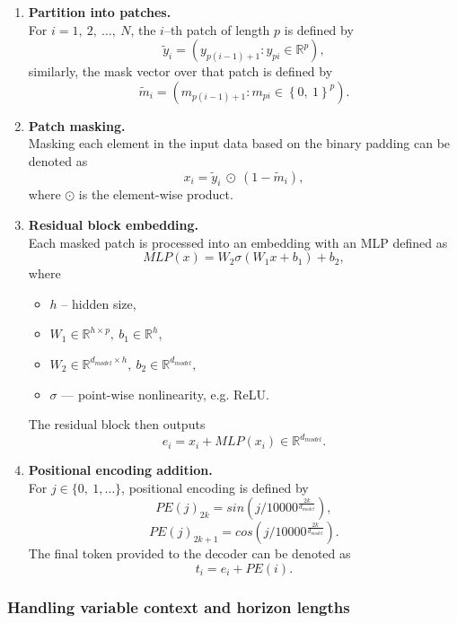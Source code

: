 \begin{enumerate}
    \item \textbf{Partition into patches.}\\
        For $ i = 1,\ 2,\ \ldots, \ N $, the $ i $--th patch of length $ p $ is defined by
        \[ \tilde{y}_i = \left( y_{p(i-1)+1}:y_{pi} \in \mathbb{R}^p \right),\]
        similarly, the mask vector over that patch is defined by
        \[ \tilde{m}_i=\left( m_{p(i-1)+1}:m_{pi} \in \left\{ 0,\ 1 \right\}^p \right).\]
    \item \textbf{Patch masking.}\\
        Masking each element in the input data based on the binary padding can be denoted as
        \[ x_i = \tilde{y}_i\ \odot\ (1-\tilde{m}_i),\]
        where $\odot$ is the element-wise product.
    \item \textbf{Residual block embedding.}\\
        Each masked patch is processed into an embedding with an MLP defined as
        \[MLP(x) = W_2 \sigma(W_1x+b_1) + b_2,\]
        where
        \begin{itemize}
            \item $ h $ -- hidden size,
            \item $ W_1 \in \mathbb{R}^{h\times p},\ b_1\in \mathbb{R}^h $,
            \item $ W_2 \in \mathbb{R}^{d_{model}\times h},\ b_2 \in \mathbb{R}^{d_{model}}, $
            \item $ \sigma $ --- point-wise nonlinearity, e.g. ReLU. %
        \end{itemize}
        The residual block then outputs
        \[e_i = x_i + MLP(x_i) \in \mathbb{R}^{d_{model}}.\]
    \item \textbf{Positional encoding addition.}\\
        For $ j \in \{0,\ 1, \ldots\} $, positional encoding is defined by
        \[PE(j)_{2k}=sin\left(j / 10000^{\frac{2k}{d_{model}}}\right),\]
        \[PE(j)_{2k+1}=cos\left(j / 10000^{\frac{2k}{d_{model}}}\right).\]
        The final token provided to the decoder can be denoted as
        \[t_i = e_i+PE(i).\]
\end{enumerate}

\subsubsection{Handling variable context and horizon lengths}

